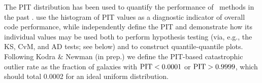 The PIT distribution has been used to quantify the performance of \pzpdf\ methods in the past \citep[e.~g.~][]{Bordoloi:10,Polsterer:16,Tanaka:17}.
\citet{Tanaka:17} use the histogram of PIT values as a diagnostic indicator of overall code performance, while \citet{Freeman:17} independently define the PIT and demonstrate how its individual values may be used both to perform hypothesis testing (via, e.g., the KS, CvM, and AD tests; see below) and to construct quantile-quantile plots.
Following Kodra \& Newman (in prep.) we define the PIT-based catastrophic outlier rate as the fraction of galaxies with $\rm{PIT} < 0.0001$ or $\rm{PIT} > 0.9999$, which should total 0.0002 for an ideal uniform distribution.





